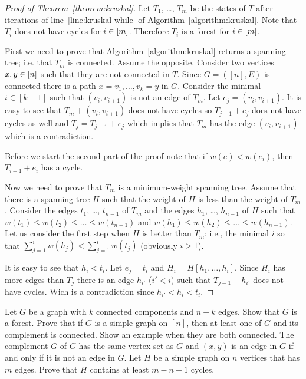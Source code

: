 \begin{proof}[Proof of Theorem~\ref{theorem:kruskal}]
  Let $T_1$, \dots, $T_m$ be the states of $T$ after iterations of
  line~\ref{line:kruskal-while} of Algorithm~\ref{algorithm:kruskal}.
  Note that $T_i$ does not have cycles for $i \in {[{m}]}$. Therefore $T_i$ is a
  forest for $i \in {[{m}]}$.

  First we need to prove that Algorithm~\ref{algorithm:kruskal} returns a
  spanning tree; i.e. that $T_m$ is connected.
  Assume the opposite. Consider two vertices $x, y \in {[{n}]}$ such that
  they are not connected in $T$. Since $G = ([n], E)$ is connected there is a
  path $x = v_1, \dots, v_k = y$ in $G$. Consider the minimal $i \in [k - 1]$
  such that $(v_i, v_{i + 1})$ is not an edge of $T_m$. Let
  $e_j = (v_i, v_{i + 1})$. It is easy to see that $T_m + (v_i, v_{i + 1})$ does
  not have cycles so $T_{j - 1} + e_j$ does not have cycles as well and $T_j =
  T_{j - 1} + e_j$ which implies that $T_m$ has the edge $(v_i, v_{i + 1})$
  which is a contradiction.

  Before we start the second part of the proof note that if $w(e) < w(e_i)$,
  then $T_{i - 1} + e_i$ has a cycle.

  Now we need to prove that $T_m$ is a minimum-weight spanning tree. Assume
  that there is a spanning tree $H$ such that the weight of $H$ is less than
  the weight of $T_m$. Consider the edges $t_1$, \dots, $t_{n - 1}$ of $T_m$
  and the edges $h_1$, \dots, $h_{n - 1}$ of $H$ such that
  $w(t_1) \le w(t_2) \le \dots \le w(t_{n - 1})$ and
  $w(h_1) \le w(h_2) \le \dots \le w(h_{n - 1})$.
  Let us consider the first step when $H$ is better than $T_m$; i.e., the
  minimal $i$ so that $\sum_{j = 1}^i w(h_j) < \sum_{j = 1}^i w(t_j)$
  (obviously $i > 1$).

  It is easy to see that $h_i < t_i$. Let $e_j = t_i$ and
  $H_i = H[h_1, \dots, h_i]$. Since $H_i$ has more edges than $T_j$ there is an
  edge $h_{i'}$ ($i' < i$) such that $T_{j - 1} + h_{i'}$ does not have cycles.
  Wich is a contradiction since $h_{i'} < h_i < t_i$.
\end{proof}


\begin{chapterendexercises}
  \exercise[recommended] Let $G$ be a graph with $k$ connected components and
    $n - k$ edges. Show that $G$ is a forest.
  \exercise Prove that if $G$ is a simple graph on $[n]$, then at least one of
    $G$ and its complement is connected. Show an example when they are both
    connected. The complement $\bar{G}$ of $G$ has the same vertex set as $G$
    and $(x, y)$ is an edge in $\bar{G}$ if and only if it is not an edge in
    $G$.
  \exercise Let $H$ be a simple graph on $n$ vertices that has $m$ edges. Prove
    that $H$ contains at least $m - n - 1$ cycles.
\end{chapterendexercises}
